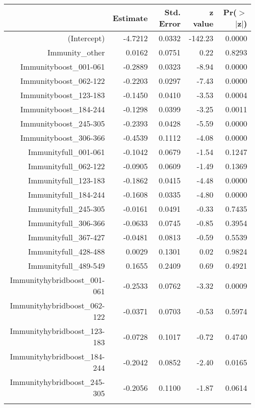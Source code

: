 \begin{table}[ht]
\centering
\begin{tabular}{rrrrr}
  \hline
 & Estimate & Std. Error & z value & Pr($>$$|$z$|$) \\ 
  \hline
(Intercept) & -4.7212 & 0.0332 & -142.23 & 0.0000 \\ 
  Immunity\_other & 0.0162 & 0.0751 & 0.22 & 0.8293 \\ 
  Immunityboost\_001-061 & -0.2889 & 0.0323 & -8.94 & 0.0000 \\ 
  Immunityboost\_062-122 & -0.2203 & 0.0297 & -7.43 & 0.0000 \\ 
  Immunityboost\_123-183 & -0.1450 & 0.0410 & -3.53 & 0.0004 \\ 
  Immunityboost\_184-244 & -0.1298 & 0.0399 & -3.25 & 0.0011 \\ 
  Immunityboost\_245-305 & -0.2393 & 0.0428 & -5.59 & 0.0000 \\ 
  Immunityboost\_306-366 & -0.4539 & 0.1112 & -4.08 & 0.0000 \\ 
  Immunityfull\_001-061 & -0.1042 & 0.0679 & -1.54 & 0.1247 \\ 
  Immunityfull\_062-122 & -0.0905 & 0.0609 & -1.49 & 0.1369 \\ 
  Immunityfull\_123-183 & -0.1862 & 0.0415 & -4.48 & 0.0000 \\ 
  Immunityfull\_184-244 & -0.1608 & 0.0335 & -4.80 & 0.0000 \\ 
  Immunityfull\_245-305 & -0.0161 & 0.0491 & -0.33 & 0.7435 \\ 
  Immunityfull\_306-366 & -0.0633 & 0.0745 & -0.85 & 0.3954 \\ 
  Immunityfull\_367-427 & -0.0481 & 0.0813 & -0.59 & 0.5539 \\ 
  Immunityfull\_428-488 & 0.0029 & 0.1301 & 0.02 & 0.9824 \\ 
  Immunityfull\_489-549 & 0.1655 & 0.2409 & 0.69 & 0.4921 \\ 
  Immunityhybridboost\_001-061 & -0.2533 & 0.0762 & -3.32 & 0.0009 \\ 
  Immunityhybridboost\_062-122 & -0.0371 & 0.0703 & -0.53 & 0.5974 \\ 
  Immunityhybridboost\_123-183 & -0.0728 & 0.1017 & -0.72 & 0.4740 \\ 
  Immunityhybridboost\_184-244 & -0.2042 & 0.0852 & -2.40 & 0.0165 \\ 
  Immunityhybridboost\_245-305 & -0.2056 & 0.1100 & -1.87 & 0.0614 \\ 
$$
\end{tabular}
\end{table}
